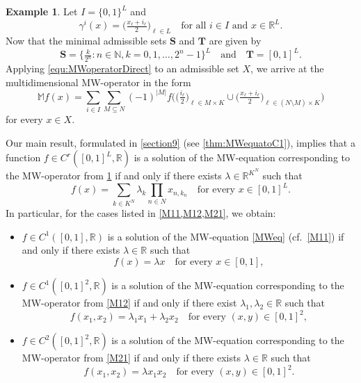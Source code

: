\documentclass{amsart}
\theoremstyle{plain}%
\theoremstyle{definition}
\newtheorem{example}[theorem]{Example}
\theoremstyle{remark}
\begin{document}
\begin{example}\label{Mrs}
Let $I=\{0,1\}^L$ and 
\begin{equation*}
\gamma^i(x)=\big(\tfrac{x_\ell+i_\ell}{2}\big)_{\ell\in L}
\quad\text{for all }i\in I\text{ and }x\in\mathbb{R}^L.
\end{equation*}
Now that the minimal admissible sets $\textbf{S}$ and $\textbf{T}$ are given by 
\begin{equation*}
\textbf{S}=\big\{\tfrac{k}{2^n}:n\in\mathbb{N},k=0,1,\dots,2^n-1\big\}^L\quad\text{and}\quad 
\textbf{T}=[0,1]^L.
\end{equation*}
Applying \eqref{equ:MWoperatorDirect} to an admissible set $X$, we arrive at the multidimensional MW\nobreakdash-operator in the form
\begin{equation*}
\mathbb{M}f(x)=\sum_{i\in I}\sum_{M\subseteq N}(-1)^{|M|}
f\Big(\big(\tfrac{i_\ell}{2}\big)_{\ell\in M\times K}\cup
\big(\tfrac{x_\ell+i_\ell}{2}\big)_{\ell\in (N\setminus M)\times K}\Big)
\end{equation*}
for every $x\in X$.
\end{example}

Our main result, formulated in \cref{section9} (see \cref{thm:MWequatoC1}), implies that a function $f\in C^r([0,1]^L,\mathbb{R})$ is a solution of the MW\nobreakdash-equation corresponding to the MW\nobreakdash-operator from \cref{Mrs} if and only if there exists $\lambda\in \mathbb{R}^{K^N}$ such that
\begin{equation*}
f(x)=\sum_{k\in K^N}\lambda_k\prod_{n\in N}x_{n,k_n}\quad\text{for every }x\in [0,1]^L.
\end{equation*}
In particular, for the cases listed in \cref{M11,M12,M21}, we obtain:
\begin{itemize}
\item[(i)] $f\in C^1([0,1],\mathbb R)$ is a solution of the MW\nobreakdash-equation \eqref{MWeq} (cf.~\cref{M11}) if and only if there exists $\lambda\in \mathbb{R}$ such that \begin{equation*}
f(x)=\lambda x\quad\text{for every }x\in[0,1],
\end{equation*}
\item[(ii)] $f\in C^1([0,1]^2,\mathbb R)$ is a solution of the MW\nobreakdash-equation corresponding to the MW\nobreakdash-operator from \cref{M12} if and only if there exist $\lambda_1,\lambda_2\in\mathbb R$ such that 
\begin{equation*}
f(x_1,x_2)=\lambda_1 x_1+\lambda_2 x_2\quad\text{for every }(x,y)\in[0,1]^2,
\end{equation*}
\item[(iii)] $f\in C^2([0,1]^2,\mathbb R)$ is a solution of the MW\nobreakdash-equation corresponding to the MW\nobreakdash-operator from \cref{M21} if and only if there exists $\lambda\in\mathbb R$ such that 
\begin{equation*}
f(x_1,x_2)=\lambda x_1x_2\quad\text{for every }(x,y)\in[0,1]^2.
\end{equation*}
\end{itemize} 
\end{document}
